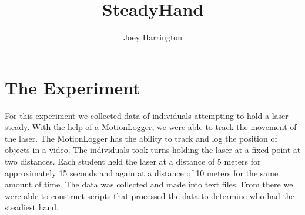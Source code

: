 \documentclass[10pt,letterpaper]{article}
\author{Joey Harrington}
\title{SteadyHand}
\begin{document}
\maketitle
\section*{The Experiment}
For this experiment we collected data of individuals attempting to hold a laser steady. With the help of a MotionLogger, we were able to track the movement of the laser. The MotionLogger has the ability to track and log the position of objects in a video. The individuals took turns holding the laser at a fixed point at two distances. Each student held the laser at a distance of 5 meters for approximately 15 seconds and again at a distance of 10 meters for the same amount of time. The data was collected and made into text files. From there we were able to construct scripts that processed the data to determine who had the steadiest hand.
\end{document}
